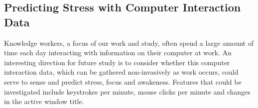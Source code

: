 \subsection{Predicting Stress with Computer Interaction Data}
Knowledge workers, a focus of our work and study, often spend
a large amount of time each day interacting with information on 
their computer at work. An interesting direction for future study
is to consider whether this computer interaction data, which can
be gathered non-invasively as work occurs, could serve to sense
and predict stress, focus and awakeness. Features that could be
investigated include keystrokes per minute, mouse clicks per minute
and changes in the active window title.








